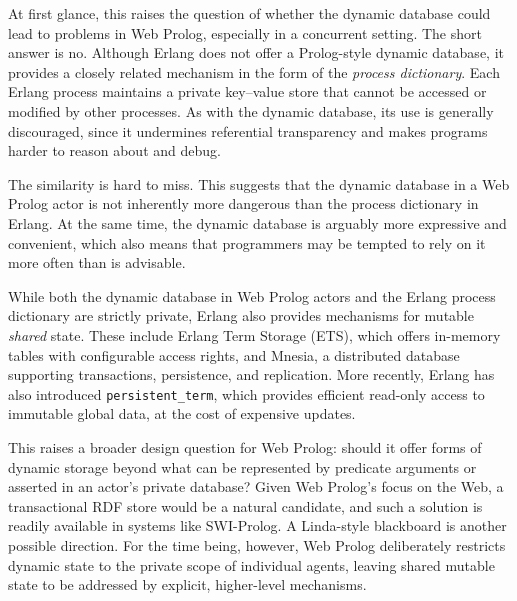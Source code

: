 At first glance, this raises the question of whether the dynamic database could lead to problems in Web Prolog, especially in a concurrent setting. The short answer is no. Although Erlang does not offer a Prolog-style dynamic database, it provides a closely related mechanism in the form of the \textit{process dictionary}. Each Erlang process maintains a private key--value store that cannot be accessed or modified by other processes. As with the dynamic database, its use is generally discouraged, since it undermines referential transparency and makes programs harder to reason about and debug.

The similarity is hard to miss. This suggests that the dynamic database in a Web Prolog actor is not inherently more dangerous than the process dictionary in Erlang. At the same time, the dynamic database is arguably more expressive and convenient, which also means that programmers may be tempted to rely on it more often than is advisable.

While both the dynamic database in Web Prolog actors and the Erlang process dictionary are strictly private, Erlang also provides mechanisms for mutable \emph{shared} state. These include Erlang Term Storage (ETS), which offers in-memory tables with configurable access rights, and Mnesia, a distributed database supporting transactions, persistence, and replication. More recently, Erlang has also introduced \texttt{persistent\_term}, which provides efficient read-only access to immutable global data, at the cost of expensive updates.

This raises a broader design question for Web Prolog: should it offer forms of dynamic storage beyond what can be represented by predicate arguments or asserted in an actor's private database? Given Web Prolog's focus on the Web, a transactional RDF store would be a natural candidate, and such a solution is readily available in systems like SWI-Prolog. A Linda-style blackboard is another possible direction. For the time being, however, Web Prolog deliberately restricts dynamic state to the private scope of individual agents, leaving shared mutable state to be addressed by explicit, higher-level mechanisms.



